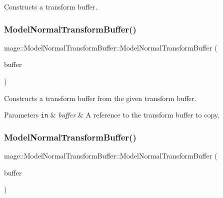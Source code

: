 Constructs a transform buffer. \hypertarget{structmage_1_1_model_normal_transform_buffer_a2718abe76ffc0d6cd278aad9d4020429}{}\label{structmage_1_1_model_normal_transform_buffer_a2718abe76ffc0d6cd278aad9d4020429} 
\subsubsection{\texorpdfstring{Model\+Normal\+Transform\+Buffer()}{ModelNormalTransformBuffer()}\hspace{0.1cm}{\footnotesize\ttfamily [2/3]}}
{\footnotesize\ttfamily mage\+::\+Model\+Normal\+Transform\+Buffer\+::\+Model\+Normal\+Transform\+Buffer (\begin{DoxyParamCaption}\item[{const \hyperlink{structmage_1_1_model_normal_transform_buffer}{Model\+Normal\+Transform\+Buffer} \&}]{buffer }\end{DoxyParamCaption})\hspace{0.3cm}{\ttfamily [default]}}

Constructs a transform buffer from the given transform buffer.


\begin{DoxyParams}[1]{Parameters}
\mbox{\tt in}  & {\em buffer} & A reference to the transform buffer to copy. \\
\hline
\end{DoxyParams}
\hypertarget{structmage_1_1_model_normal_transform_buffer_a415530ed6d4a2bd31424b11af6b1ebee}{}\label{structmage_1_1_model_normal_transform_buffer_a415530ed6d4a2bd31424b11af6b1ebee} 
\subsubsection{\texorpdfstring{Model\+Normal\+Transform\+Buffer()}{ModelNormalTransformBuffer()}\hspace{0.1cm}{\footnotesize\ttfamily [3/3]}}
{\footnotesize\ttfamily mage\+::\+Model\+Normal\+Transform\+Buffer\+::\+Model\+Normal\+Transform\+Buffer (\begin{DoxyParamCaption}\item[{\hyperlink{structmage_1_1_model_normal_transform_buffer}{Model\+Normal\+Transform\+Buffer} \&\&}]{buffer }\end{DoxyParamCaption})\hspace{0.3cm}{\ttfamily [default]}}

